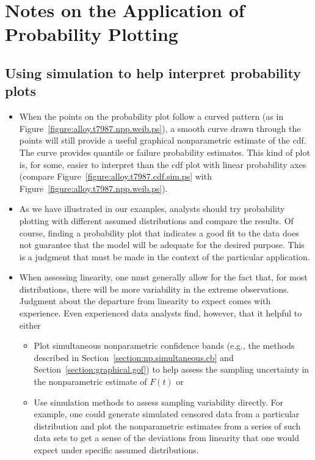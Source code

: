 \section{Notes on the Application of Probability Plotting}
\label{section.probplot.notes}
\subsection{Using simulation to help interpret probability plots}
\begin{itemize}
\item 
When the points on the probability plot follow a curved pattern (as in
Figure~\ref{figure:alloy.t7987.npp.weib.ps}), a smooth curve drawn
through the points will still provide a useful graphical nonparametric
estimate of the cdf. The curve provides quantile or failure
probability estimates. This kind of plot is, for some, easier to
interpret than the cdf plot with linear probability axes (compare
Figure~\ref{figure:alloy.t7987.cdf.sim.ps} with
Figure~\ref{figure:alloy.t7987.npp.weib.ps}).
\item 
As we have illustrated in our examples, analysts should try
probability plotting with different assumed distributions and compare
the results.  Of course, finding a probability plot that indicates a
good fit to the data does not guarantee that the model will be
adequate for the desired purpose. This is a judgment that must be
made in the context of the particular application.
\item 
When assessing linearity, one must generally allow for the fact
that, for most distributions, there will be more variability in the
extreme observations.  Judgment about the departure from
linearity to expect comes with experience.  Even experienced data
analysts find, however, that it helpful to either
\begin{itemize}
\item 
Plot simultaneous nonparametric confidence bands (e.g., the methods
described in Section~\ref{section:np.simultaneous.cb}
and Section~\ref{section:graphical.gof}) to help assess the
sampling uncertainty in the nonparametric estimate of $F(t)$ or
\item 
Use simulation methods to assess sampling variability directly. For
example, one could generate simulated censored data from a particular
distribution and plot the nonparametric estimates from a series of such
data sets to get a sense of the deviations from linearity that one
would expect under specific assumed distributions.
\end{itemize}
\end{itemize}

